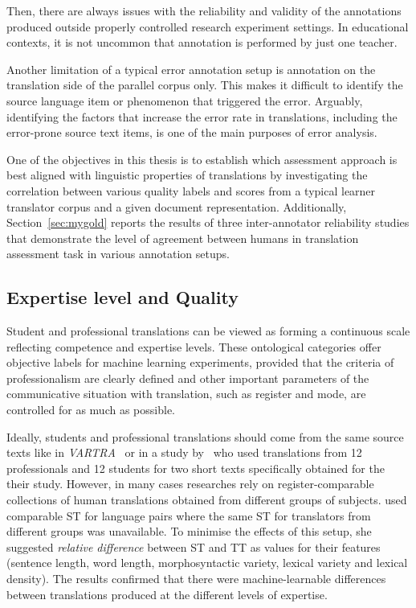Then, there are always issues with the reliability and validity of the annotations produced outside properly controlled research experiment settings. In educational contexts, it is not uncommon that annotation is performed by just one teacher. 

Another limitation of a typical error annotation setup is annotation on the translation side of the parallel corpus only. This makes it difficult to identify the source language item or phenomenon that triggered the error. Arguably, identifying the factors that increase the error rate in translations, including the error-prone source text items, is one of the main purposes of error analysis.

One of the objectives in this thesis is to establish which assessment approach is best aligned with linguistic properties of translations by investigating the correlation between various quality labels and scores from a typical learner translator corpus and a given document representation. 
Additionally, Section~\ref{sec:mygold} reports the results of three inter-annotator reliability studies that demonstrate the level of agreement between humans in translation assessment task in various annotation setups. %

\subsection{\label{ssec:pro}Expertise level and Quality}
Student and professional translations can be viewed as forming a continuous scale reflecting competence and expertise levels. These ontological categories offer objective labels for machine learning experiments, provided that the criteria of professionalism are clearly defined and other important parameters of the communicative situation with translation, such as register and mode, are controlled for as much as possible. 

Ideally, students and professional translations should come from the same source texts like in \textit{VARTRA}~\cite{Lapshinova2013} or in a study by~\citet{Carl2010} who used translations from 12 professionals and 12 students for two short texts specifically obtained for the their study. However, in many cases researches rely on register-comparable collections of human translations obtained from different groups of subjects. \citet{Popovic2020} used comparable ST for language pairs where the same ST for translators from different groups was unavailable. To minimise the effects of this setup, she suggested \textit{relative difference} between ST and TT as values for their features (sentence length, word length, morphosyntactic variety, lexical variety and lexical density). The results confirmed that there were machine-learnable differences between translations produced at the different levels of expertise.

